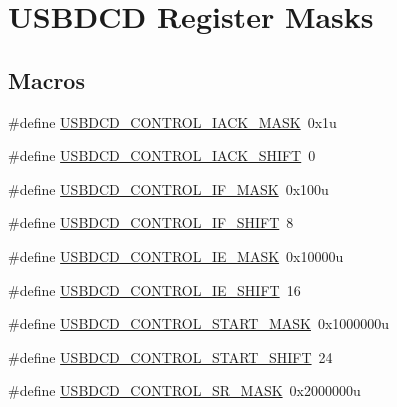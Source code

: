 \hypertarget{group___u_s_b_d_c_d___register___masks}{}\section{U\+S\+B\+D\+CD Register Masks}
\label{group___u_s_b_d_c_d___register___masks}
\subsection*{Macros}
\begin{DoxyCompactItemize}
\item 
\#define \hyperlink{group___u_s_b_d_c_d___register___masks_ga23b5eadab7d4201af1198723a3b93ae5}{U\+S\+B\+D\+C\+D\+\_\+\+C\+O\+N\+T\+R\+O\+L\+\_\+\+I\+A\+C\+K\+\_\+\+M\+A\+SK}~0x1u
\item 
\#define \hyperlink{group___u_s_b_d_c_d___register___masks_ga4a96149273b083d48c5917e9b915b92f}{U\+S\+B\+D\+C\+D\+\_\+\+C\+O\+N\+T\+R\+O\+L\+\_\+\+I\+A\+C\+K\+\_\+\+S\+H\+I\+FT}~0
\item 
\#define \hyperlink{group___u_s_b_d_c_d___register___masks_gabedad7b2fec7990f45af8add013a19c7}{U\+S\+B\+D\+C\+D\+\_\+\+C\+O\+N\+T\+R\+O\+L\+\_\+\+I\+F\+\_\+\+M\+A\+SK}~0x100u
\item 
\#define \hyperlink{group___u_s_b_d_c_d___register___masks_ga576f9434f9947991055f40c1ab3a38c1}{U\+S\+B\+D\+C\+D\+\_\+\+C\+O\+N\+T\+R\+O\+L\+\_\+\+I\+F\+\_\+\+S\+H\+I\+FT}~8
\item 
\#define \hyperlink{group___u_s_b_d_c_d___register___masks_ga44f183d0863aeac1154727de57ee6fb6}{U\+S\+B\+D\+C\+D\+\_\+\+C\+O\+N\+T\+R\+O\+L\+\_\+\+I\+E\+\_\+\+M\+A\+SK}~0x10000u
\item 
\#define \hyperlink{group___u_s_b_d_c_d___register___masks_ga33f53d29349cc16bb002486da4472ece}{U\+S\+B\+D\+C\+D\+\_\+\+C\+O\+N\+T\+R\+O\+L\+\_\+\+I\+E\+\_\+\+S\+H\+I\+FT}~16
\item 
\#define \hyperlink{group___u_s_b_d_c_d___register___masks_ga02bb74c9b2d9fd907d02b72ec4f2dc0c}{U\+S\+B\+D\+C\+D\+\_\+\+C\+O\+N\+T\+R\+O\+L\+\_\+\+S\+T\+A\+R\+T\+\_\+\+M\+A\+SK}~0x1000000u
\item 
\#define \hyperlink{group___u_s_b_d_c_d___register___masks_ga8a353cada7464a5898998c45b2caabb5}{U\+S\+B\+D\+C\+D\+\_\+\+C\+O\+N\+T\+R\+O\+L\+\_\+\+S\+T\+A\+R\+T\+\_\+\+S\+H\+I\+FT}~24
\item 
\#define \hyperlink{group___u_s_b_d_c_d___register___masks_ga7455215193ec55d79026af2e09a7523f}{U\+S\+B\+D\+C\+D\+\_\+\+C\+O\+N\+T\+R\+O\+L\+\_\+\+S\+R\+\_\+\+M\+A\+SK}~0x2000000u

\end{DoxyCompactItemize}
